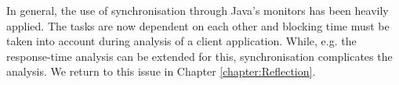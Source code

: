 In general, the use of synchronisation through Java's monitors has been heavily applied. The tasks are now dependent on each other and blocking time must be taken into account during analysis of a client application. While, e.g. the response-time analysis can be extended for this\cite{alan2001real}, synchronisation complicates the analysis. We return to this issue in Chapter \ref{chapter:Reflection}.